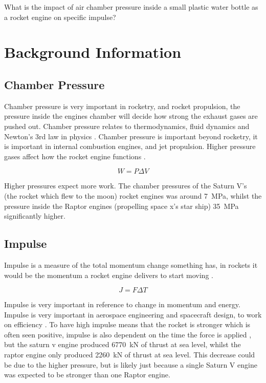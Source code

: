 \documentclass[12pt,a4paper]{article}
\begin{document}
What is the impact of air chamber pressure inside a small plastic water bottle as a rocket engine on specific impulse?

\section{Background Information}

\subsection{Chamber Pressure}

Chamber pressure is very important in rocketry, and rocket propulsion, the pressure inside the engines chamber will decide how strong the exhaust gases are pushed out. Chamber pressure relates to thermodynamics, fluid dynamics and Newton's 3rd law in physics \cite{ref2}. Chamber pressure is important beyond rocketry, it is important in internal combustion engines, and jet propulsion. Higher pressure gases affect how the rocket engine functions \cite{ref1}. 

\begin{equation}
W = P\Delta V
\end{equation}

Higher pressures expect more work. The chamber pressures of the Saturn V's (the rocket which flew to the moon) rocket engines was around \SI{7}{\mega\pascal}, whilst the pressure inside the Raptor engines (propelling space x's star ship) \SI{35}{\mega\pascal} significantly higher.

\subsection{Impulse}

Impulse is a measure of the total momentum change something has, in rockets it would be the momentum a rocket engine delivers to start moving \cite{ref5}. 

\begin{equation}
J = F\Delta T
\end{equation}

Impulse is very important in reference to change in momentum and energy. Impulse is very important in aerospace engineering and spacecraft design, to work on efficiency \cite{ref3}. To have high impulse means that the rocket is stronger which is often seen positive, impulse is also dependent on the time the force is applied \cite{ref4}, but the saturn v engine produced \SI{6770}{\kilo\newton} of thrust at sea level, whilst the raptor engine only produced \SI{2260}{\kilo\newton} of thrust at sea level. This decrease could be due to the higher pressure, but is likely just because a single Saturn V engine was expected to be stronger than one Raptor engine.
\end{document}
